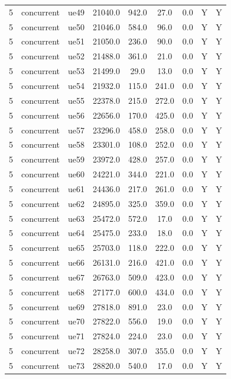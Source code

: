\begin{table}[ht]
\begin{tabular}{|c|c|c|c|c|c|c|c|c|}
5 & concurrent & ue49 & 21040.0 & 942.0 & 27.0 & 0.0 & Y & Y \\
5 & concurrent & ue50 & 21046.0 & 584.0 & 96.0 & 0.0 & Y & Y \\
5 & concurrent & ue51 & 21050.0 & 236.0 & 90.0 & 0.0 & Y & Y \\
5 & concurrent & ue52 & 21488.0 & 361.0 & 21.0 & 0.0 & Y & Y \\
5 & concurrent & ue53 & 21499.0 & 29.0 & 13.0 & 0.0 & Y & Y \\
5 & concurrent & ue54 & 21932.0 & 115.0 & 241.0 & 0.0 & Y & Y \\
5 & concurrent & ue55 & 22378.0 & 215.0 & 272.0 & 0.0 & Y & Y \\
5 & concurrent & ue56 & 22656.0 & 170.0 & 425.0 & 0.0 & Y & Y \\
5 & concurrent & ue57 & 23296.0 & 458.0 & 258.0 & 0.0 & Y & Y \\
5 & concurrent & ue58 & 23301.0 & 108.0 & 252.0 & 0.0 & Y & Y \\
5 & concurrent & ue59 & 23972.0 & 428.0 & 257.0 & 0.0 & Y & Y \\
5 & concurrent & ue60 & 24221.0 & 344.0 & 221.0 & 0.0 & Y & Y \\
5 & concurrent & ue61 & 24436.0 & 217.0 & 261.0 & 0.0 & Y & Y \\
5 & concurrent & ue62 & 24895.0 & 325.0 & 359.0 & 0.0 & Y & Y \\
5 & concurrent & ue63 & 25472.0 & 572.0 & 17.0 & 0.0 & Y & Y \\
5 & concurrent & ue64 & 25475.0 & 233.0 & 18.0 & 0.0 & Y & Y \\
5 & concurrent & ue65 & 25703.0 & 118.0 & 222.0 & 0.0 & Y & Y \\
5 & concurrent & ue66 & 26131.0 & 216.0 & 421.0 & 0.0 & Y & Y \\
5 & concurrent & ue67 & 26763.0 & 509.0 & 423.0 & 0.0 & Y & Y \\
5 & concurrent & ue68 & 27177.0 & 600.0 & 434.0 & 0.0 & Y & Y \\
5 & concurrent & ue69 & 27818.0 & 891.0 & 23.0 & 0.0 & Y & Y \\
5 & concurrent & ue70 & 27822.0 & 556.0 & 19.0 & 0.0 & Y & Y \\
5 & concurrent & ue71 & 27824.0 & 224.0 & 23.0 & 0.0 & Y & Y \\
5 & concurrent & ue72 & 28258.0 & 307.0 & 355.0 & 0.0 & Y & Y \\
5 & concurrent & ue73 & 28820.0 & 540.0 & 17.0 & 0.0 & Y & Y \\

\end{tabular}
\end{table}
